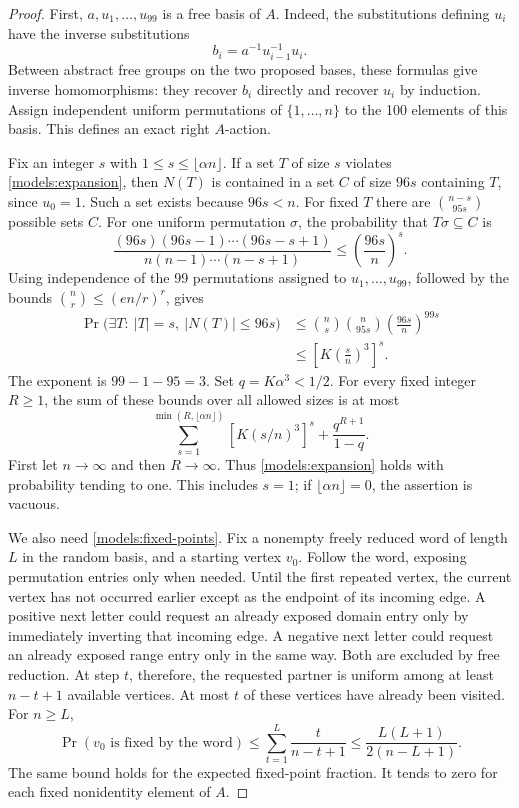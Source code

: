 \begin{proof}
First, $a,u_1,\ldots,u_{99}$ is a free basis of $A$. Indeed, the
substitutions defining $u_i$ have the inverse substitutions
\[
 b_i=a^{-1}u_{i-1}^{-1}u_i.
\]
Between abstract free groups on the two proposed bases, these formulas
give inverse homomorphisms: they recover $b_i$ directly and recover
$u_i$ by induction. Assign independent uniform permutations of
$\{1,\ldots,n\}$ to the 100 elements of this basis. This defines an
exact right $A$-action.

Fix an integer $s$ with $1\le s\le\lfloor\alpha n\rfloor$. If a set
$T$ of size $s$ violates \eqref{models:expansion}, then $N(T)$ is
contained in a set $C$ of size $96s$ containing $T$, since $u_0=1$.
Such a set exists because $96s<n$. For fixed $T$ there are
$\binom{n-s}{95s}$ possible sets $C$. For one uniform permutation
$\sigma$, the probability that $T\sigma\subseteq C$ is
\[
 \frac{(96s)(96s-1)\cdots(96s-s+1)}{n(n-1)\cdots(n-s+1)}
 \le \left(\frac{96s}{n}\right)^s.
\]
Using independence of the 99 permutations assigned to $u_1,\ldots,u_{99}$,
followed by the bounds $\binom nr\le(en/r)^r$, gives
\begin{align*}
 \Pr\bigl(\exists T:\ |T|=s,\ |N(T)|\le96s\bigr)
 &\le\binom ns\binom n{95s}
                 \left(\frac{96s}{n}\right)^{99s}\\
 &\le\left[K\left(\frac{s}{n}\right)^3\right]^s.
\end{align*}
The exponent is $99-1-95=3$. Set $q=K\alpha^3<1/2$.
For every fixed integer $R\ge1$, the sum of these bounds over all
allowed sizes is at most
\[
 \sum_{s=1}^{\min(R,\lfloor\alpha n\rfloor)}
       [K(s/n)^3]^s+\frac{q^{R+1}}{1-q}.
\]
First let $n\to\infty$ and then $R\to\infty$. Thus
\eqref{models:expansion} holds with probability tending to one.
This includes $s=1$; if $\lfloor\alpha n\rfloor=0$, the assertion is
vacuous.

We also need \eqref{models:fixed-points}. Fix a nonempty freely reduced
word of length $L$ in the random basis, and a starting vertex $v_0$.
Follow the word, exposing permutation entries only when needed. Until
the first repeated vertex, the current vertex has not occurred earlier
except as the endpoint of its incoming edge. A positive next letter
could request an already exposed domain entry only by immediately
inverting that incoming edge. A negative next letter could request an
already exposed range entry only in the same way. Both are excluded
by free reduction. At step $t$, therefore, the requested partner is
uniform among at least $n-t+1$ available vertices. At most $t$ of
these vertices have already been visited. For $n\ge L$,
\[
 \Pr(v_0\text{ is fixed by the word})
 \le\sum_{t=1}^L\frac{t}{n-t+1}
 \le\frac{L(L+1)}{2(n-L+1)}.
\]
The same bound holds for the expected fixed-point fraction. It tends
to zero for each fixed nonidentity element of $A$.


\end{proof}
